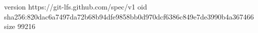 version https://git-lfs.github.com/spec/v1
oid sha256:820dac6a7497da72b68b94dfe9858bb0d970dcf6386c849e7de3990b4a367466
size 99216
